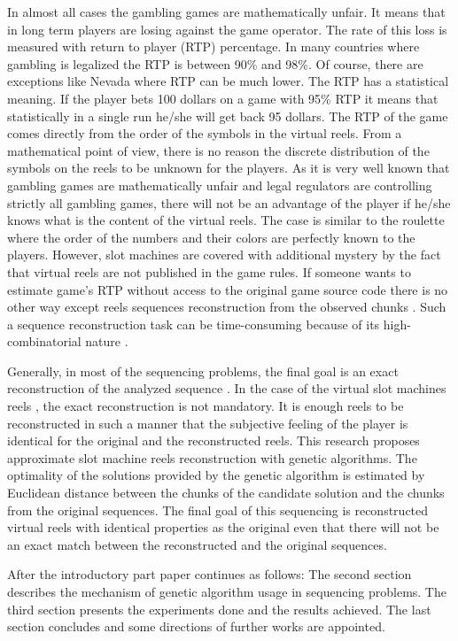 \documentclass[11pt]{article}
\begin{document}
In almost all cases the gambling games are mathematically unfair. It means that in long term players are losing against the game operator. The rate of this loss is measured with return to player (RTP) percentage. In many countries where gambling is legalized the RTP is between 90\% and 98\%. Of course, there are exceptions like Nevada where RTP can be much lower. The RTP has a statistical meaning. If the player bets 100 dollars on a game with 95\% RTP it means that statistically in a single run he/she will get back 95 dollars. The RTP of the game comes directly from the order of the symbols in the virtual reels. From a mathematical point of view, there is no reason the discrete distribution of the symbols on the reels to be unknown for the players. As it is very well known that gambling games are mathematically unfair and legal regulators are controlling strictly all gambling games, there will not be an advantage of the player if he/she knows what is the content of the virtual reels. The case is similar to the roulette where the order of the numbers and their colors are perfectly known to the players. However, slot machines are covered with additional mystery by the fact that virtual reels are not published in the game rules. If someone wants to estimate game's RTP without access to the original game source code there is no other way except reels sequences reconstruction from the observed chunks \cite{Vaidyanathan-Phoong-1995}. Such a sequence reconstruction task can be time-consuming because of its high-combinatorial nature \cite{Lewis-1998}.

Generally, in most of the sequencing problems, the final goal is an exact reconstruction of the analyzed sequence \cite{Parsons-Johnson-1997}. In the case of the virtual slot machines reels \cite{Tomov-Zankinski-Balabanov-2017}, the exact reconstruction is not mandatory. It is enough reels to be reconstructed in such a manner that the subjective feeling of the player is identical for the original and the reconstructed reels. This research proposes approximate slot machine reels reconstruction with genetic algorithms. The optimality of the solutions provided by the genetic algorithm is estimated by Euclidean distance between the chunks of the candidate solution and the chunks from the original sequences. The final goal of this sequencing is reconstructed virtual reels with identical properties as the original even that there will not be an exact match between the reconstructed and the original sequences. 

After the introductory part paper continues as follows: The second section describes the mechanism of genetic algorithm usage in sequencing problems. The third section presents the experiments done and the results achieved. The last section concludes and some directions of further works are appointed. 
\end{document}
